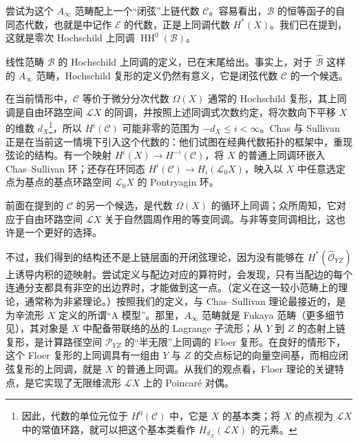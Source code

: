尝试为这个 $A_\infty$ 范畴配上一个“闭弦”上链代数 $\mathcal{C}$。容易看出，$\mathcal{B}$ 的恒等函子的自同态代数，也就是中记作 $\mathcal{E}$ 的代数，正是上同调代数 $H^*(X)$。我们已在提到，这就是零次 Hochschild 上同调 $\operatorname{HH}^0(\mathcal{B})$。

线性范畴 $\mathcal{B}$ 的 Hochschild 上同调的定义，已在末尾给出。事实上，对于 $\widehat{\mathcal{B}}$ 这样的 $A_\infty$ 范畴，Hochschild 复形的定义仍然有意义，它是闭弦代数 $\mathcal{C}$ 的一个候选。

在当前情形中，$\mathcal{C}$ 等价于微分分次代数 $\Omega(X)$ 通常的 Hochschild 复形，其上同调是自由环路空间 $\mathcal{L}X$ 的同调，并按照上述同调式次数约定，将次数向下平移 $X$ 的维数 $d_X$\footnote{因此，代数的单位元位于 $H^0(\mathcal{C})$ 中，它是 $X$ 的基本类；将 $X$ 的点视为 $\mathcal{L}X$ 中的常值环路，就可以把这个基本类看作 $H_{d_X}(\mathcal{L}X)$ 的元素。}，所以 $H^i(\mathcal{C})$ 可能非零的范围为 $-d_X\le i<\infty$。Chas 与 Sullivan 正是在当前这一情境下引入这个代数的：他们试图在经典代数拓扑的框架中，重现弦论的结构。有一个映射 $H^i(X)\to H^{-i}(\mathcal{C})$，将 $X$ 的普通上同调环嵌入 Chas--Sullivan 环；还存在环同态 $H^i(\mathcal{C})\to H_i(\mathcal{L}_0X)$，映入以 $X$ 中任意选定点为基点的基点环路空间 $\mathcal{L}_0X$ 的 Pontryagin 环。

前面在提到的 $\mathcal{C}$ 的另一个候选，是代数 $\Omega(X)$ 的循环上同调；众所周知，它对应于自由环路空间 $\mathcal{L}X$ 关于自然圆周作用的等变同调。与非等变同调相比，这也许是一个更好的选择。

不过，我们得到的结构还不是上链层面的开闭弦理论，因为没有能够在 $H^*(\widehat{\mathcal{O}}_{YZ})$ 上诱导内积的迹映射。尝试定义与配边对应的算符时，会发现，只有当配边的每个连通分支都具有非空的出边界时，才能做到这一点。（定义在这一较小范畴上的理论，通常称为非紧理论。）按照我们的定义，与 Chas--Sullivan 理论最接近的，是为辛流形 $X$ 定义的所谓“A 模型”。那里，$A_\infty$ 范畴就是 Fukaya 范畴（更多细节见），其对象是 $X$ 中配备带联络的丛的 Lagrange 子流形；从 $Y$ 到 $Z$ 的态射上链复形，是计算路径空间 $\mathcal{P}_{YZ}$ 的“半无限”上同调的 Floer 复形。在良好的情形下，这个 Floer 复形的上同调具有一组由 $Y$ 与 $Z$ 的交点标记的向量空间基，而相应闭弦复形的上同调，就是 $X$ 的普通上同调。从我们的观点看，Floer 理论的关键特点，是它实现了无限维流形 $\mathcal{L}X$ 上的 Poincaré 对偶。

